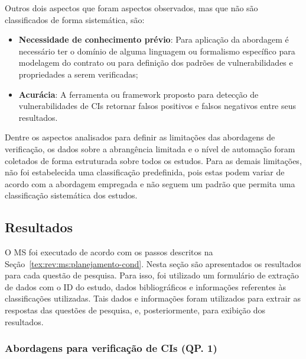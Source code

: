 Outros dois aspectos que foram aspectos observados, mas que não são classificados de forma sistemática, são:

\begin{itemize}
    \item \textbf{Necessidade de conhecimento prévio}: Para aplicação da abordagem é necessário ter o domínio de alguma linguagem ou formalismo específico para modelagem do contrato ou para definição dos padrões de vulnerabilidades e propriedades a serem verificadas;
    \item \textbf{Acurácia}: A ferramenta ou framework proposto para detecção de vulnerabilidades de CIs retornar falsos positivos e falsos negativos entre seus resultados.
\end{itemize}

Dentre os aspectos analisados para definir as limitações das abordagens de verificação, os dados sobre a abrangência limitada e o nível de automação foram coletados de forma estruturada sobre todos os estudos. Para as demais limitações, não foi estabelecida uma classificação predefinida, pois estas podem variar de acordo com a abordagem empregada e não seguem um padrão que permita uma classificação sistemática dos estudos.



\subsection{Resultados}\label{tex:rev:ms:publicacao}

O MS foi executado de acordo com os passos descritos na Seção~\ref{tex:rev:ms:planejamento-cond}. Nesta seção são apresentados os resultados para cada questão de pesquisa. Para isso, foi utilizado um formulário de extração de dados com o ID do estudo, dados bibliográficos e informações referentes às classificações utilizadas. Tais dados e informações foram utilizados para extrair as respostas das questões de pesquisa, e, posteriormente, para exibição dos resultados.

\subsubsection*{\textbf{Abordagens para verificação de CIs (QP. 1)}}


